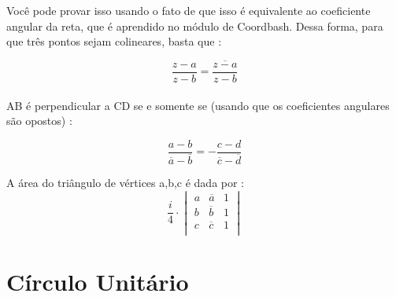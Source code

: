 \documentclass{article}
\begin{document}
Você pode provar isso usando o fato de que isso é equivalente ao coeficiente angular da reta, que é aprendido no módulo de Coordbash. Dessa forma, para que três pontos sejam colineares, basta que : 

$$\frac{z-a}{z-b} = \overline{\frac{z-a}{z-b}}$$
\\
AB é perpendicular a CD se e somente se (usando que os coeficientes angulares são opostos) :

$$\frac{a-b}{\overline{a} - \overline{b}} = - \frac{c-d}{\overline{c} - \overline{d}}$$

\begin{tcolorbox}[colback=blue!5!white,colframe=blue!75!black,title=Área complexa\emoji{nerd-face}]
A área do triângulo de vértices a,b,c é dada por : 
$$
\frac{i}{4} \cdot 
\begin{vmatrix}
a & \overline{a} & 1 \\
b & \overline{b} & 1 \\
c & \overline{c} & 1 \\
\end{vmatrix}
$$
\end{tcolorbox}

\section{Círculo Unitário}
\end{document}
